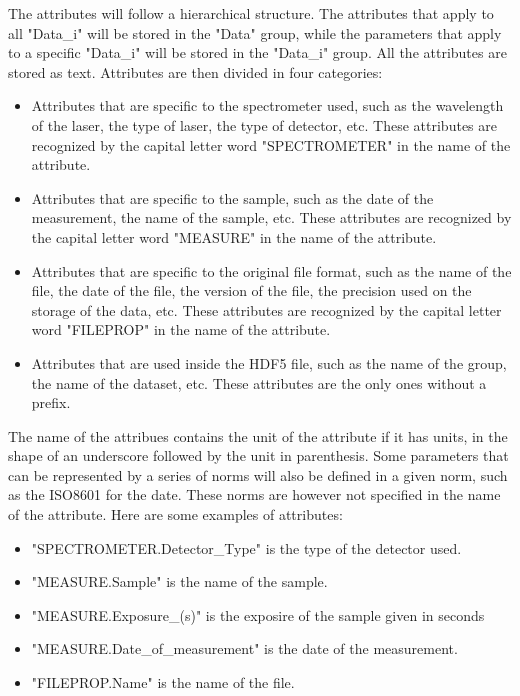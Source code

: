 \documentclass{book}
\begin{document}
            The attributes will follow a hierarchical structure. The attributes that apply to all "Data\_i" will be stored in the "Data" group, while the parameters that apply to a specific "Data\_i" will be stored in the "Data\_i" group. All the attributes are stored as text. Attributes are then divided in four categories:
            \begin{itemize}
                \item Attributes that are specific to the spectrometer used, such as the wavelength of the laser, the type of laser, the type of detector, etc. These attributes are recognized by the capital letter word "SPECTROMETER" in the name of the attribute.
                \item Attributes that are specific to the sample, such as the date of the measurement, the name of the sample, etc. These attributes are recognized by the capital letter word "MEASURE" in the name of the attribute.
                \item Attributes that are specific to the original file format, such as the name of the file, the date of the file, the version of the file, the precision used on the storage of the data, etc. These attributes are recognized by the capital letter word "FILEPROP" in the name of the attribute.
                \item Attributes that are used inside the HDF5 file, such as the name of the group, the name of the dataset, etc. These attributes are the only ones without a prefix.
            \end{itemize}

            The name of the attribues contains the unit of the attribute if it has units, in the shape of an underscore followed by the unit in parenthesis. Some parameters that can be represented by a series of norms will also be defined in a given norm, such as the ISO8601 for the date. These norms are however not specified in the name of the attribute. Here are some examples of attributes:
            \begin{itemize}
                \item "SPECTROMETER.Detector\_Type" is the type of the detector used.
                \item "MEASURE.Sample" is the name of the sample.
                \item "MEASURE.Exposure\_(s)" is the exposire of the sample given in seconds
                \item "MEASURE.Date\_of\_measurement" is the date of the measurement. 
                \item "FILEPROP.Name" is the name of the file.
            \end{itemize}
\end{document}
